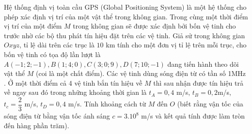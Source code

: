 \begin{ex}%
Hệ thống định vị toàn cầu GPS (Global Positioning System) là một hệ thống cho phép xác định vị trí của một vật thể trong không gian. Trong cùng một thời điểm vị trí của một điểm $ M$ trong không gian sẽ được xác định bởi bốn vệ tinh cho trước nhờ các bộ thu phát tín hiệu đặt trên các vệ tinh. Giả sử trong không gian $ Oxyz$, tỉ lệ dài trên các trục là $10$ km tính cho một đơn vị tỉ lệ trên mỗi trục, cho bốn vệ tinh có tọa độ lần lượt là $ A\left(-1;2;-1\right),B\left(1;4;0\right),C\left(3;0;9\right),D\left(7;10;-1\right)$ đang tiến hành theo dõi vật thể $ M$ (coi là một chất điểm). Các vệ tinh dùng sóng điện từ có tần số 1MHz . Ở một thời điểm cả 4 vệ tinh bắn tín hiệu về $ M$ thì sau nhận được tín hiệu trả về ngay sau đó trong những khoảng thời gian là $t_A=0,4$ m/s, $t_B=0,2 $m/s, $ t_c=\dfrac{2}{3}$ m/s, $t_D=0,4$ m/s. Tính khoảng cách từ $ M$ đến $ O$ (biết rằng vận tốc của sóng điện từ bằng vận tốc ánh sáng $ c=3.10^8$ m/s và kết quả tính được làm tròn đến hàng phần trăm).
\end{ex}

